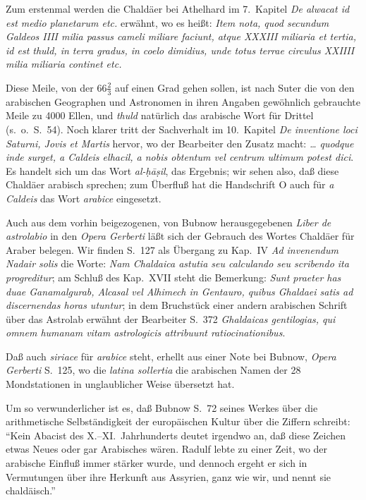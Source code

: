 \documentclass[11pt,a4paper]{article}
\newcommand{\s}[1]{\d{#1}}     %
\newcommand{\enquote}[1]{``#1''}
\begin{document}
Zum erstenmal werden die Chald\"aer bei Athelhard im 7.\ Kapitel \textit{De alwacat id est medio planetarum etc.} erw\"ahnt, wo es hei\ss{}t: \textit{Item nota, quod secundum Galdeos IIII milia passus cameli miliare faciunt, atque XXXIII miliaria et tertia, id est thuld, in terra gradus, in coelo dimidius, unde totus terrae circulus XXIIII milia miliaria continet etc.}

Diese Meile, von der $66\frac{2}{3}$ auf einen Grad gehen sollen, ist nach Suter die von den arabischen Geographen und Astronomen in ihren Angaben gew\"ohnlich gebrauchte Meile zu 4000 Ellen, und \textit{thuld} nat\"urlich das arabische Wort f\"ur Drittel (s.\ o.\ S.\ 54). Noch klarer tritt der Sachverhalt im 10.\ Kapitel \textit{De inventione loci Saturni, Jovis et Martis} hervor, wo der Bearbeiter den Zusatz macht: \textit{\ldots{} quodque inde surget, a Caldeis elhacil, a nobis obtentum vel centrum ultimum potest dici}. Es handelt sich um das Wort \textit{al-\d{h}\=a\s{s}il}, das Ergebnis; wir sehen also, da\ss{} diese Chald\"aer arabisch sprechen; zum \"Uberflu\ss{} hat die Handschrift O auch f\"ur \textit{a Caldeis} das Wort \textit{arabice} eingesetzt.

Auch aus dem vorhin beigezogenen, von Bubnow herausgegebenen \textit{Liber de astrolabio} in den \textit{Opera Gerberti} l\"a\ss{}t sich der Gebrauch des Wortes Chald\"aer f\"ur Araber belegen. Wir finden S.\ 127 als \"Ubergang zu Kap.\ IV \textit{Ad invenendum Nadair solis} die Worte: \textit{Nam Chaldaica astutia seu calculando seu scribendo ita progreditur}; am Schlu\ss{} des Kap.\ XVII steht die Bemerkung: \textit{Sunt praeter has duae Ganamalgurab, Alcasal vel Alhimech in Gentauro, quibus Ghaldaei satis ad discernendas horas utuntur}; in dem Bruchst\"uck einer andern arabischen Schrift \"uber das Astrolab erw\"ahnt der Bearbeiter S.\ 372 \textit{Ghaldaicas gentilogias, qui omnem humanam vitam astrologicis attribuunt ratiocinationibus}.

Da\ss{} auch \textit{siriace} f\"ur \textit{arabice} steht, erhellt aus einer Note bei Bubnow, \textit{Opera Gerberti} S.\ 125, wo die \textit{latina sollertia} die arabischen Namen der 28 Mondstationen in unglaublicher Weise \"ubersetzt hat.

Um so verwunderlicher ist es, da\ss{} Bubnow S.\ 72 seines Werkes \"uber die arithmetische Selbst\"andigkeit der europ\"aischen Kultur \"uber die Ziffern schreibt: \enquote{Kein Abacist des X.--XI.\ Jahrhunderts deutet irgendwo an, da\ss{} diese Zeichen etwas Neues oder gar Arabisches w\"aren. Radulf lebte zu einer Zeit, wo der arabische Einflu\ss{} immer st\"arker wurde, und dennoch ergeht er sich in Vermutungen \"uber ihre Herkunft aus Assyrien, ganz wie wir, und nennt sie chald\"aisch.}
\end{document}
